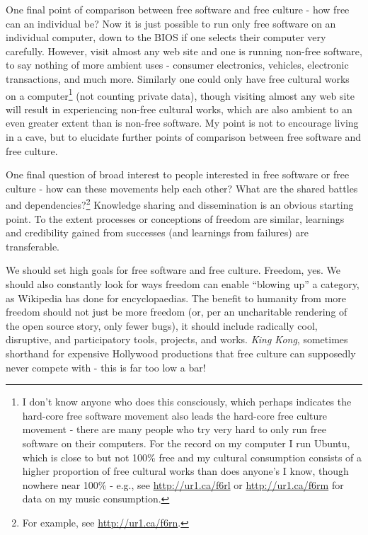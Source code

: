 One f\hbox{}inal point of comparison between free software and free culture -
how free can an individual be? Now it is just possible to run only free software
on an individual computer, down to the BIOS if one selects their computer very
carefully. However, visit almost any web site and one is running non-free
software, to say nothing of more ambient uses - consumer electronics, vehicles,
electronic transactions, and much more. Similarly one could only have free
cultural works on a computer\footnote{I don't know anyone who does this
consciously, which perhaps indicates the hard-core free software movement also
leads the hard-core free culture movement - there are many people who try very
hard to only run free software on their computers. For the record on my computer
I run Ubuntu, which is close to but not 100\% free and my cultural consumption
consists of a higher proportion of free cultural works than does anyone's I
know, though nowhere near 100\% - e.g., see \url{http://ur1.ca/f6rl} or
\url{http://ur1.ca/f6rm} for data on my music consumption.} (not counting
private data), though visiting almost any web site will result in experiencing
non-free cultural works, which are also ambient to an even greater extent than
is non-free software. My point is not to encourage living in a cave, but to
elucidate further points of comparison between free software and free culture.

One f\hbox{}inal question of broad interest to people interested in free
software or free culture - how can these movements help each other? What are the
shared battles and dependencies?\footnote{For example, see
\url{http://ur1.ca/f6rn}.} Knowledge sharing and dissemination is an obvious
starting point. To the extent processes or conceptions of freedom are similar,
learnings and credibility gained from successes (and learnings from failures)
are transferable.

We should set high goals for free software and free culture. Freedom, yes. We
should also constantly look for ways freedom can enable ``blowing up'' a
category, as Wikipedia has done for encyclopaedias. The benef\hbox{}it to
humanity from more freedom should not just be more freedom (or, per an
uncharitable rendering of the open source story, only fewer bugs), it should
include radically cool, disruptive, and participatory tools, projects, and
works. \textit{King Kong}, sometimes shorthand for expensive Hollywood
productions that free culture can supposedly never compete with - this is far
too low a bar!

